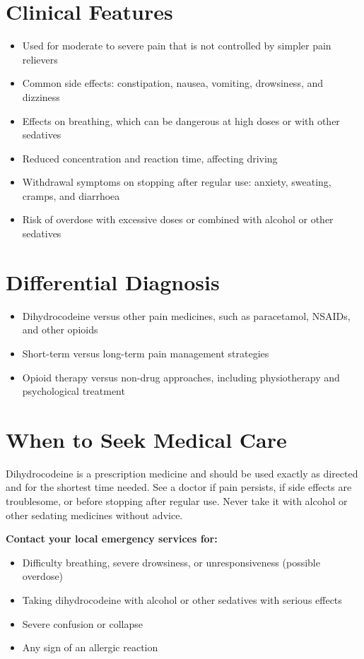\section*{Clinical Features}
\begin{itemize}
    \item Used for moderate to severe pain that is not controlled by simpler pain relievers
    \item Common side effects: constipation, nausea, vomiting, drowsiness, and dizziness
    \item Effects on breathing, which can be dangerous at high doses or with other sedatives
    \item Reduced concentration and reaction time, affecting driving
    \item Withdrawal symptoms on stopping after regular use: anxiety, sweating, cramps, and diarrhoea
    \item Risk of overdose with excessive doses or combined with alcohol or other sedatives
\end{itemize}

\section*{Differential Diagnosis}
\begin{itemize}
    \item Dihydrocodeine versus other pain medicines, such as paracetamol, NSAIDs, and other opioids
    \item Short-term versus long-term pain management strategies
    \item Opioid therapy versus non-drug approaches, including physiotherapy and psychological treatment
\end{itemize}

\section*{When to Seek Medical Care}
Dihydrocodeine is a prescription medicine and should be used exactly as directed and for the shortest time needed. See a doctor if pain persists, if side effects are troublesome, or before stopping after regular use. Never take it with alcohol or other sedating medicines without advice.

\textbf{Contact your local emergency services for:}
\begin{itemize}
    \item Difficulty breathing, severe drowsiness, or unresponsiveness (possible overdose)
    \item Taking dihydrocodeine with alcohol or other sedatives with serious effects
    \item Severe confusion or collapse
    \item Any sign of an allergic reaction
\end{itemize}

